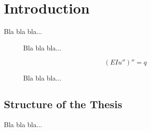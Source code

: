 \chapter{Introduction}

Bla bla bla...

\begin{figure}[tb]
    \centering
    \caption{Bla bla bla...}
    \label{fig:illustateTopOpt}
\end{figure}


\begin{equation}
    (EIu'')'' = q
\end{equation}


\begin{figure}[tb]
    \centering
    \makebox[\textwidth][c]{}%
    \caption{Bla bla bla...}
    \label{fig:Rank}
\end{figure}


\section{Structure of the Thesis}


Bla bla bla...